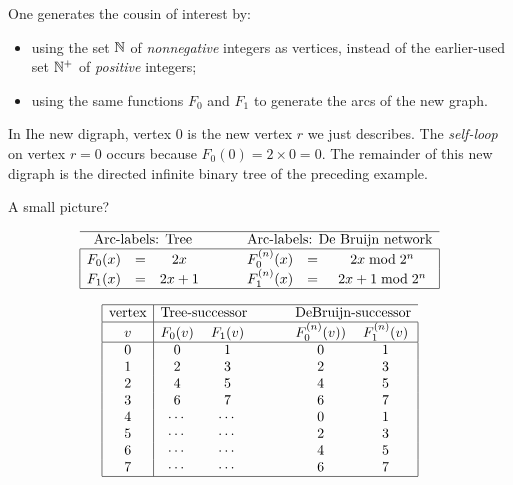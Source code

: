 One generates the cousin of interest by:
\begin{itemize}
\item
using the set $\mathbb{N}$ of {\em nonnegative} integers as vertices, instead of the earlier-used
set $\mathbb{N}^+$ of {\em positive} integers;
\item
using the same functions $F_0$ and $F_1$ to generate the arcs of the new graph.
\end{itemize}
In Ihe new digraph, vertex $0$ is the new vertex $r$ we just describes.  The {\em self-loop} on
vertex $r=0$ occurs because $F_0(0) = 2 \times 0 = 0$.  The remainder of this new digraph is the
directed infinite binary tree of the preceding example.

{\Arny A small picture?}

\medskip

\[
\begin{array}{|ccccccc|}
\hline
\multicolumn{3}{c}{\mbox{Arc-labels: Tree}} & \hspace*{.2in}& \multicolumn{3}{c}{\mbox{Arc-labels: De Bruijn network}} \\
\hline 
F_0(x) & = & 2x      &  &  F^{(n)}_0(x) & = & 2x \bmod 2^n \\
F_1(x) & = & 2x+1  &  &  F^{(n)}_1(x) & = & 2x +1 \bmod 2^n \\ 
\hline
\end{array}
\]

\[
\begin{array}{|c|ccccc|}
\hline
\mbox{vertex} & \multicolumn{2}{c}{\mbox{Tree-successor}} & \hspace*{.2in} & \multicolumn{2}{c}{\mbox{DeBruijn-successor}} \\
\hline
v & F_0(v) & F_1(v) & & F^{(n)}_0(v))& F^{(n)}_1(v) \\
\hline
0 & 0 & 1 & & 0 & 1 \\ 
1 & 2 & 3 & & 2 & 3 \\
2 & 4 & 5 & & 4 & 5 \\
3 & 6 & 7 & & 6 & 7 \\
4 & \cdots & \cdots  & & 0 & 1 \\
5 & \cdots & \cdots  & & 2 & 3 \\
6 & \cdots & \cdots  & & 4 & 5 \\
7 & \cdots & \cdots  & & 6 & 7 \\
\hline
\end{array}
\]
